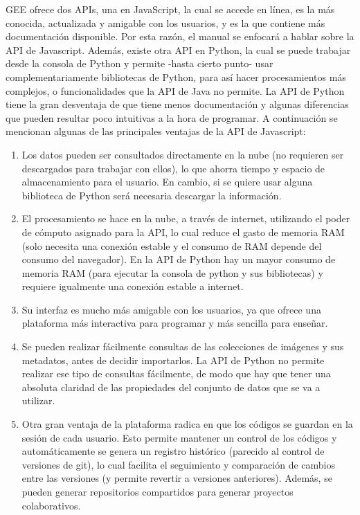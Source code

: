 \documentclass[
  12pt,
  letterpaper,
  twoside]{book}
\providecommand{\tightlist}{%
  \setlength{\itemsep}{0pt}\setlength{\parskip}{0pt}}
\begin{document}
GEE ofrece dos APIs, una en JavaScript, la cual se accede en línea, es la más conocida, actualizada y amigable con los usuarios, y es la que contiene más documentación disponible. Por esta razón, el manual se enfocará a hablar sobre la API de Javascript. Además, existe otra API en Python, la cual se puede trabajar desde la consola de Python y permite -hasta cierto punto- usar complementariamente bibliotecas de Python, para así hacer procesamientos más complejos, o funcionalidades que la API de Java no permite. La API de Python tiene la gran desventaja de que tiene menos documentación y algunas diferencias que pueden resultar poco intuitivas a la hora de programar. A continuación se mencionan algunas de las principales ventajas de la API de Javascript:

\begin{enumerate}
\def\labelenumi{\arabic{enumi}.}
\tightlist
\item
  Los datos pueden ser consultados directamente en la nube (no requieren ser descargados para trabajar con ellos), lo que ahorra tiempo y espacio de almacenamiento para el usuario. En cambio, si se quiere usar alguna biblioteca de Python será necesaria descargar la información.
\item
  El procesamiento se hace en la nube, a través de internet, utilizando el poder de cómputo asignado para la API, lo cual reduce el gasto de memoria RAM (solo necesita una conexión estable y el consumo de RAM depende del consumo del navegador). En la API de Python hay un mayor consumo de memoria RAM (para ejecutar la consola de python y sus bibliotecas) y requiere igualmente una conexión estable a internet.
\item
  Su interfaz es mucho más amigable con los usuarios, ya que ofrece una plataforma más interactiva para programar y más sencilla para enseñar.
\item
  Se pueden realizar fácilmente consultas de las colecciones de imágenes y sus metadatos, antes de decidir importarlos. La API de Python no permite realizar ese tipo de consultas fácilmente, de modo que hay que tener una absoluta claridad de las propiedades del conjunto de datos que se va a utilizar.
\item
  Otra gran ventaja de la plataforma radica en que los códigos se guardan en la sesión de cada usuario. Esto permite mantener un control de los códigos y automáticamente se genera un registro histórico (parecido al control de versiones de git), lo cual facilita el seguimiento y comparación de cambios entre las versiones (y permite revertir a versiones anteriores). Además, se pueden generar repositorios compartidos para generar proyectos colaborativos.
\end{enumerate}
\end{document}
